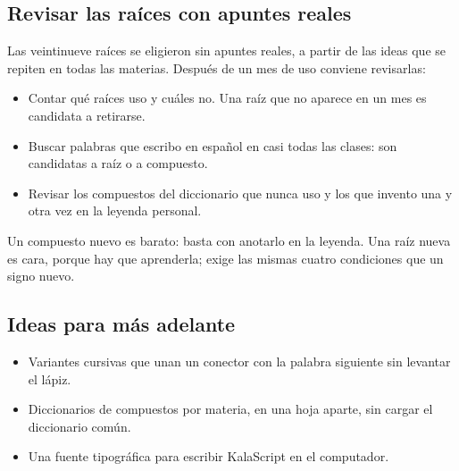 \subsection{Revisar las raíces con apuntes reales}
Las veintinueve raíces se eligieron sin apuntes reales, a partir de las ideas
que se repiten en todas las materias. Después de un mes de uso conviene revisarlas:
\begin{itemize}
\item Contar qué raíces uso y cuáles no. Una raíz que no aparece en un mes es
 candidata a retirarse.
\item Buscar palabras que escribo en español en casi todas las clases: son
 candidatas a raíz o a compuesto.
\item Revisar los compuestos del diccionario que nunca uso y los que invento
 una y otra vez en la leyenda personal.
\end{itemize}
Un compuesto nuevo es barato: basta con anotarlo en la leyenda. Una raíz nueva
es cara, porque hay que aprenderla; exige las mismas cuatro condiciones que un
signo nuevo.

\subsection{Ideas para más adelante}
\begin{itemize}
\item Variantes cursivas que unan un conector con la palabra siguiente sin
 levantar el lápiz.
\item Diccionarios de compuestos por materia, en una hoja aparte, sin cargar
 el diccionario común.
\item Una fuente tipográfica para escribir KalaScript en el computador.
\end{itemize}
